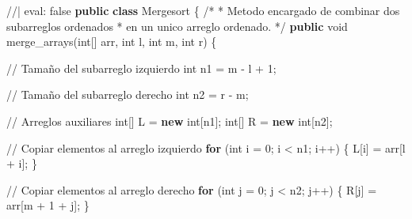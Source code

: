 \documentclass[
  spanish,
  letterpaper,
  DIV=11,
  numbers=noendperiod]{scrreprt}
\newenvironment{Shaded}{\begin{snugshade}}{\end{snugshade}}
\newcommand{\CommentTok}[1]{\textcolor[rgb]{0.37,0.37,0.37}{#1}}
\newcommand{\ControlFlowTok}[1]{\textcolor[rgb]{0.00,0.23,0.31}{\textbf{#1}}}
\newcommand{\DataTypeTok}[1]{\textcolor[rgb]{0.68,0.00,0.00}{#1}}
\newcommand{\DecValTok}[1]{\textcolor[rgb]{0.68,0.00,0.00}{#1}}
\newcommand{\FunctionTok}[1]{\textcolor[rgb]{0.28,0.35,0.67}{#1}}
\newcommand{\KeywordTok}[1]{\textcolor[rgb]{0.00,0.23,0.31}{\textbf{#1}}}
\newcommand{\NormalTok}[1]{\textcolor[rgb]{0.00,0.23,0.31}{#1}}
\newcommand{\OperatorTok}[1]{\textcolor[rgb]{0.37,0.37,0.37}{#1}}
\begin{document}
\begin{Shaded}
\begin{Highlighting}[]
\CommentTok{//| eval: false}
\KeywordTok{public} \KeywordTok{class}\NormalTok{ Mergesort }\OperatorTok{\{}
    \CommentTok{/*}
\CommentTok{     * Metodo encargado de combinar dos subarreglos ordenados}
\CommentTok{     * en un unico arreglo ordenado.}
\CommentTok{     */}
    \KeywordTok{public} \DataTypeTok{void} \FunctionTok{merge\_arrays}\OperatorTok{(}\DataTypeTok{int}\OperatorTok{[]}\NormalTok{ arr}\OperatorTok{,} \DataTypeTok{int}\NormalTok{ l}\OperatorTok{,} \DataTypeTok{int}\NormalTok{ m}\OperatorTok{,} \DataTypeTok{int}\NormalTok{ r}\OperatorTok{)} \OperatorTok{\{}

        \CommentTok{// Tamaño del subarreglo izquierdo}
        \DataTypeTok{int}\NormalTok{ n1 }\OperatorTok{=}\NormalTok{ m }\OperatorTok{{-}}\NormalTok{ l }\OperatorTok{+} \DecValTok{1}\OperatorTok{;}

        \CommentTok{// Tamaño del subarreglo derecho}
        \DataTypeTok{int}\NormalTok{ n2 }\OperatorTok{=}\NormalTok{ r }\OperatorTok{{-}}\NormalTok{ m}\OperatorTok{;}

        \CommentTok{// Arreglos auxiliares}
        \DataTypeTok{int}\OperatorTok{[]}\NormalTok{ L }\OperatorTok{=} \KeywordTok{new} \DataTypeTok{int}\OperatorTok{[}\NormalTok{n1}\OperatorTok{];}
        \DataTypeTok{int}\OperatorTok{[]}\NormalTok{ R }\OperatorTok{=} \KeywordTok{new} \DataTypeTok{int}\OperatorTok{[}\NormalTok{n2}\OperatorTok{];}

        \CommentTok{// Copiar elementos al arreglo izquierdo}
        \ControlFlowTok{for} \OperatorTok{(}\DataTypeTok{int}\NormalTok{ i }\OperatorTok{=} \DecValTok{0}\OperatorTok{;}\NormalTok{ i }\OperatorTok{\textless{}}\NormalTok{ n1}\OperatorTok{;}\NormalTok{ i}\OperatorTok{++)} \OperatorTok{\{}
\NormalTok{            L}\OperatorTok{[}\NormalTok{i}\OperatorTok{]} \OperatorTok{=}\NormalTok{ arr}\OperatorTok{[}\NormalTok{l }\OperatorTok{+}\NormalTok{ i}\OperatorTok{];}
        \OperatorTok{\}}

        \CommentTok{// Copiar elementos al arreglo derecho}
        \ControlFlowTok{for} \OperatorTok{(}\DataTypeTok{int}\NormalTok{ j }\OperatorTok{=} \DecValTok{0}\OperatorTok{;}\NormalTok{ j }\OperatorTok{\textless{}}\NormalTok{ n2}\OperatorTok{;}\NormalTok{ j}\OperatorTok{++)} \OperatorTok{\{}
\NormalTok{            R}\OperatorTok{[}\NormalTok{j}\OperatorTok{]} \OperatorTok{=}\NormalTok{ arr}\OperatorTok{[}\NormalTok{m }\OperatorTok{+} \DecValTok{1} \OperatorTok{+}\NormalTok{ j}\OperatorTok{];}
        \OperatorTok{\}}


\end{Highlighting}
\end{Shaded}
\end{document}
